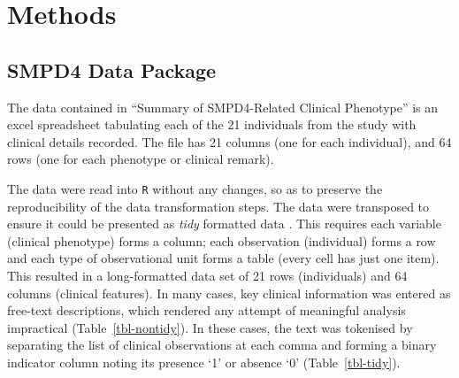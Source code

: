 \documentclass[
  authoryear,
  preprint,
  3p]{elsarticle}
\begin{document}
\hypertarget{methods}{%
\section{Methods}\label{methods}}

\hypertarget{smpd4-data-package}{%
\subsection{SMPD4 Data Package}\label{smpd4-data-package}}

The data contained in \citet{magini2019loss} ``Summary of SMPD4-Related
Clinical Phenotype'' is an excel spreadsheet tabulating each of the 21
individuals from the study with clinical details recorded. The file has
21 columns (one for each individual), and 64 rows (one for each
phenotype or clinical remark).

The data were read into \texttt{R} \citep{rbase} without any changes, so
as to preserve the reproducibility of the data transformation steps. The
data were transposed to ensure it could be presented as \emph{tidy}
formatted data \citep{JSSv059i10}. This requires each variable (clinical
phenotype) forms a column; each observation (individual) forms a row and
each type of observational unit forms a table (every cell has just one
item). This resulted in a long-formatted data set of 21 rows
(individuals) and 64 columns (clinical features). In many cases, key
clinical information was entered as free-text descriptions, which
rendered any attempt of meaningful analysis impractical
(Table~\ref{tbl-nontidy}). In these cases, the text was tokenised by
separating the list of clinical observations at each comma and forming a
binary indicator column noting its presence `1' or absence `0'
(Table~\ref{tbl-tidy}).
\end{document}
